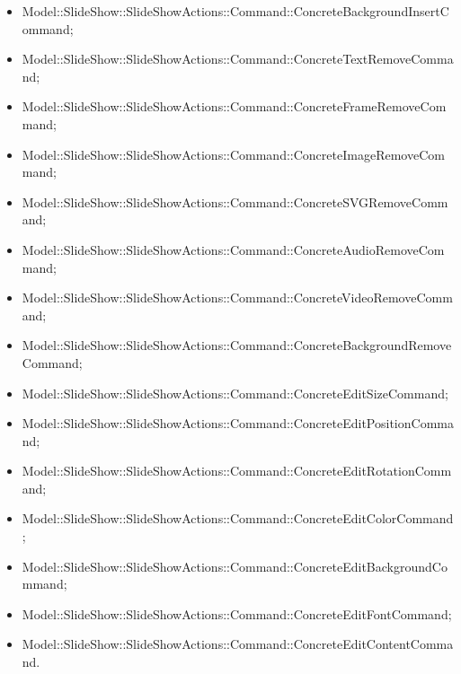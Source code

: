 {{\begin{itemize}
                    \item Model::SlideShow::SlideShowActions::Command::ConcreteBackgroundInsertCommand;
                    \item Model::SlideShow::SlideShowActions::Command::ConcreteTextRemoveCommand;
                    \item Model::SlideShow::SlideShowActions::Command::ConcreteFrameRemoveCommand;
                    \item Model::SlideShow::SlideShowActions::Command::ConcreteImageRemoveCommand;
                    \item Model::SlideShow::SlideShowActions::Command::ConcreteSVGRemoveCommand;
                    \item Model::SlideShow::SlideShowActions::Command::ConcreteAudioRemoveCommand;
                    \item Model::SlideShow::SlideShowActions::Command::ConcreteVideoRemoveCommand;
                    \item Model::SlideShow::SlideShowActions::Command::ConcreteBackgroundRemoveCommand;
                    \item Model::SlideShow::SlideShowActions::Command::ConcreteEditSizeCommand;
                    \item Model::SlideShow::SlideShowActions::Command::ConcreteEditPositionCommand;
                    \item Model::SlideShow::SlideShowActions::Command::ConcreteEditRotationCommand;
                    \item Model::SlideShow::SlideShowActions::Command::ConcreteEditColorCommand;
                    \item Model::SlideShow::SlideShowActions::Command::ConcreteEditBackgroundCommand;
                    \item Model::SlideShow::SlideShowActions::Command::ConcreteEditFontCommand;
                    \item Model::SlideShow::SlideShowActions::Command::ConcreteEditContentCommand.
                    \end{itemize}
                    }
    }
